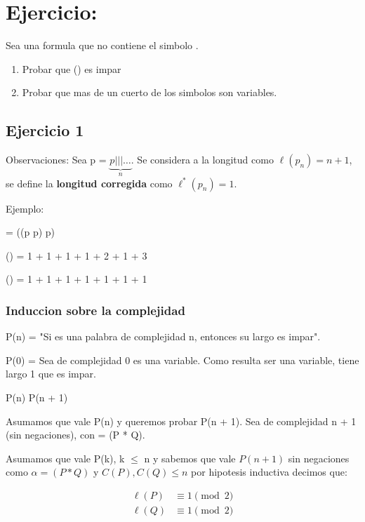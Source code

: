 \section{Ejercicio:}

Sea \calpha una formula que no contiene el simbolo \cneg.
\begin{enumerate}
	\item Probar que \length(\calpha) es impar
	\item Probar que mas de un cuerto de los simbolos son variables.
\end{enumerate}

\subsection*{Ejercicio 1} 

Observaciones: Sea p = $\underbrace{p ||| \ldots}_{n}$. Se considera a la longitud como $\ell(p_n) = n + 1$, se define la \textbf{longitud corregida} como $\ell^*(p_n) = 1$.

Ejemplo: 

\calpha = ((p \cland p) \then p)

\length(\calpha) = 1 + 1 + 1 + 1 + 2 + 1 + 3

\length\supi{*}(\calpha) = 1 + 1 + 1 + 1 + 1 + 1 + 1

\subsubsection*{Induccion sobre la complejidad}

P(n) = "Si \calpha es una palabra de complejidad n, entonces su largo es impar".

P(0) = Sea \calpha de complejidad 0 \then es una variable. Como \calpha resulta ser una variable, tiene largo 1 que es impar.

P(n) \then P(n + 1) 

Asumamos que vale P(n) y queremos probar P(n + 1). Sea \calpha de complejidad n + 1 (sin negaciones), con \calpha = (P * Q).

Asumamos que vale P(k), \cforall k $\leq$ n y sabemos que vale $P(n + 1)$ sin negaciones como $\alpha = (P * Q)$ y $C(P), C(Q) \leq n$ por hipotesis inductiva decimos que:

\begin{align} 
	\ell(P) &\equiv 1 \pmod 2\\
	\ell(Q) &\equiv 1 \pmod 2
\end{align}

